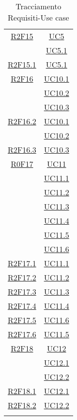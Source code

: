 \begin{longtable}{|c|c|}
\hline
\hyperlink{R2F15}{R2F15} & \hyperlink{UC5}{UC5}\\
& \hyperlink{UC5.1}{UC5.1}\\
\hline
\hyperlink{R2F15.1}{R2F15.1} & \hyperlink{UC5.1}{UC5.1}\\
\hline
\hyperlink{R2F16}{R2F16} & \hyperlink{UC10.1}{UC10.1}\\
& \hyperlink{UC10.2}{UC10.2}\\
& \hyperlink{UC10.3}{UC10.3}\\
\hline
\hyperlink{R2F16.2}{R2F16.2} & \hyperlink{UC10.1}{UC10.1}\\
& \hyperlink{UC10.2}{UC10.2}\\
\hline
\hyperlink{R2F16.3}{R2F16.3} & \hyperlink{UC10.3}{UC10.3}\\
\hline
\hyperlink{R0F17}{R0F17} & \hyperlink{UC11}{UC11}\\
& \hyperlink{UC11.1}{UC11.1}\\
& \hyperlink{UC11.2}{UC11.2}\\
& \hyperlink{UC11.3}{UC11.3}\\
& \hyperlink{UC11.4}{UC11.4}\\
& \hyperlink{UC11.5}{UC11.5}\\
& \hyperlink{UC11.6}{UC11.6}\\
\hline
\hyperlink{R2F17.1}{R2F17.1} & \hyperlink{UC11.1}{UC11.1}\\
\hline
\hyperlink{R2F17.2}{R2F17.2} & \hyperlink{UC11.2}{UC11.2}\\
\hline
\hyperlink{R2F17.3}{R2F17.3} & \hyperlink{UC11.3}{UC11.3}\\
\hline
\hyperlink{R2F17.4}{R2F17.4} & \hyperlink{UC11.4}{UC11.4}\\
\hline
\hyperlink{R2F17.5}{R2F17.5} & \hyperlink{UC11.6}{UC11.6}\\
\hline
\hyperlink{R2F17.6}{R2F17.6} & \hyperlink{UC11.5}{UC11.5}\\
\hline
\hyperlink{R2F18}{R2F18} & \hyperlink{UC12}{UC12}\\
& \hyperlink{UC12.1}{UC12.1}\\
& \hyperlink{UC12.2}{UC12.2}\\
\hline
\hyperlink{R2F18.1}{R2F18.1} & \hyperlink{UC12.1}{UC12.1}\\
\hline
\hyperlink{R2F18.2}{R2F18.2} & \hyperlink{UC12.2}{UC12.2}\\
\hline
\caption[Tracciamento Requisiti-Use case]{Tracciamento Requisiti-Use case}
\label{tabella:requi-usecase}
\end{longtable}
\clearpage
